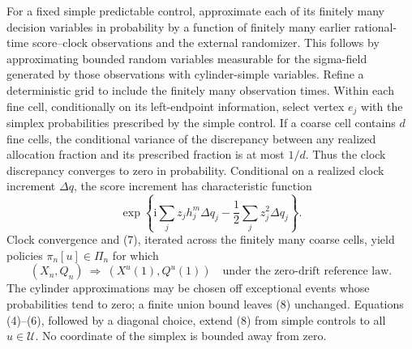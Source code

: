 For a fixed simple predictable control, approximate each of its finitely many decision variables in probability by a function of finitely many earlier rational-time score--clock observations and the external randomizer.  This follows by approximating bounded random variables measurable for the sigma-field generated by those observations with cylinder-simple variables.  Refine a deterministic grid to include the finitely many observation times.  Within each fine cell, conditionally on its left-endpoint information, select vertex \(e_j\) with the simplex probabilities prescribed by the simple control.  If a coarse cell contains \(d\) fine cells, the conditional variance of the discrepancy between any realized allocation fraction and its prescribed fraction is at most \(1/d\).  Thus the clock discrepancy converges to zero in probability.  Conditional on a realized clock increment \(\Delta q\), the score increment has characteristic function
\[
 \exp\!\left\{
   \mathrm i\sum_jz_jh_j^m\Delta q_j
   -\frac12\sum_jz_j^2\Delta q_j
 \right\}.                                                       \tag{7}
\]
Clock convergence and (7), iterated across the finitely many coarse cells, yield policies \(\pi_n[u]\in\Pi_n\) for which
\[
 (X_n,Q_n)\ \Longrightarrow\ (X^u(1),Q^u(1))
 \quad\text{under the zero-drift reference law}.                 \tag{8}
\]
The cylinder approximations may be chosen off exceptional events whose probabilities tend to zero; a finite union bound leaves (8) unchanged.  Equations (4)--(6), followed by a diagonal choice, extend (8) from simple controls to all \(u\in\mathcal U\).  No coordinate of the simplex is bounded away from zero.

